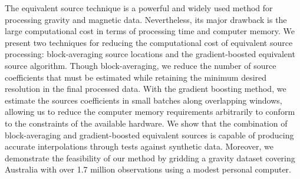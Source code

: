 The equivalent source technique is a powerful and widely used method for
processing gravity and magnetic data.  Nevertheless, its major
drawback is the large computational cost in terms of processing time and
computer memory.
We present two techniques for reducing the computational cost of equivalent
source processing: block-averaging source locations and the
gradient-boosted equivalent source algorithm.
Though block-averaging, we reduce the number of source coefficients that
must be estimated while retaining the minimum desired resolution in the final
processed data.
With the gradient boosting method, we estimate the sources coefficients in
small batches along overlapping windows, allowing us to reduce the computer
memory requirements arbitrarily to conform to the constraints of the
available hardware.
We show that the combination of block-averaging and gradient-boosted
equivalent sources is capable of producing accurate interpolations through
tests against synthetic data.
Moreover, we demonstrate the feasibility of our method by gridding a gravity
dataset covering Australia with over 1.7 million observations using a modest
personal computer.
